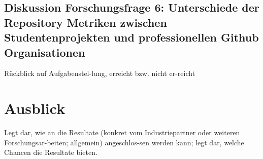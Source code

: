 \subsection{Diskussion Forschungsfrage 6: Unterschiede der Repository Metriken zwischen Studentenprojekten und professionellen Github Organisationen}


Rückblick auf Aufgabenstel-lung, erreicht bzw. nicht er-reicht

\section{Ausblick}
Legt dar, wie an die Resultate (konkret vom Industriepartner oder weiteren Forschungsar-beiten; allgemein) angeschlos-sen werden kann; legt dar, welche Chancen die Resultate bieten.



